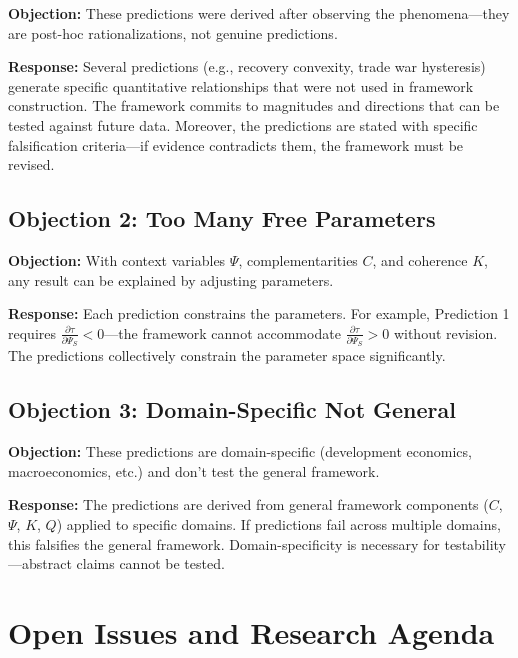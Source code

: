 \textbf{Objection:} These predictions were derived after observing the phenomena---they are post-hoc rationalizations, not genuine predictions.

\textbf{Response:} Several predictions (e.g., recovery convexity, trade war hysteresis) generate specific quantitative relationships that were not used in framework construction. The framework commits to magnitudes and directions that can be tested against future data. Moreover, the predictions are stated with specific falsification criteria---if evidence contradicts them, the framework must be revised.

\subsection{Objection 2: Too Many Free Parameters}

\textbf{Objection:} With context variables $\Psi$, complementarities $C$, and coherence $K$, any result can be explained by adjusting parameters.

\textbf{Response:} Each prediction constrains the parameters. For example, Prediction 1 requires $\frac{\partial \tau}{\partial \Psi_S} < 0$---the framework cannot accommodate $\frac{\partial \tau}{\partial \Psi_S} > 0$ without revision. The predictions collectively constrain the parameter space significantly.

\subsection{Objection 3: Domain-Specific Not General}

\textbf{Objection:} These predictions are domain-specific (development economics, macroeconomics, etc.) and don't test the general framework.

\textbf{Response:} The predictions are derived from general framework components ($C$, $\Psi$, $K$, $Q$) applied to specific domains. If predictions fail across multiple domains, this falsifies the general framework. Domain-specificity is necessary for testability---abstract claims cannot be tested.


\section{Open Issues and Research Agenda}
\label{sec:S-open}

